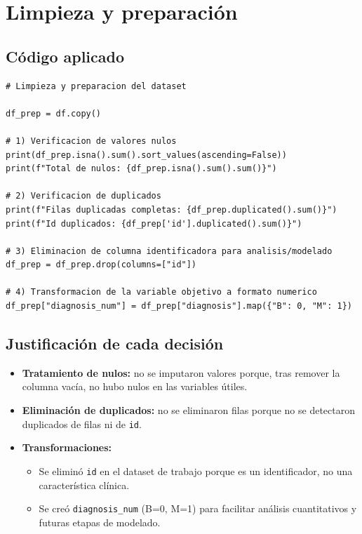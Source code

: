 \section{Limpieza y preparación}

\subsection{Código aplicado}
\begin{lstlisting}
# Limpieza y preparacion del dataset

df_prep = df.copy()

# 1) Verificacion de valores nulos
print(df_prep.isna().sum().sort_values(ascending=False))
print(f"Total de nulos: {df_prep.isna().sum().sum()}")

# 2) Verificacion de duplicados
print(f"Filas duplicadas completas: {df_prep.duplicated().sum()}")
print(f"Id duplicados: {df_prep['id'].duplicated().sum()}")

# 3) Eliminacion de columna identificadora para analisis/modelado
df_prep = df_prep.drop(columns=["id"])

# 4) Transformacion de la variable objetivo a formato numerico
df_prep["diagnosis_num"] = df_prep["diagnosis"].map({"B": 0, "M": 1})
\end{lstlisting}

\subsection{Justificación de cada decisión}
\begin{itemize}
    \item \textbf{Tratamiento de nulos:} no se imputaron valores porque, tras remover la columna vacía, no hubo nulos en las variables útiles.
    \item \textbf{Eliminación de duplicados:} no se eliminaron filas porque no se detectaron duplicados de filas ni de \texttt{id}.
    \item \textbf{Transformaciones:}
    \begin{itemize}
        \item Se eliminó \texttt{id} en el dataset de trabajo porque es un identificador, no una característica clínica.
        \item Se creó \texttt{diagnosis\_num} (B=0, M=1) para facilitar análisis cuantitativos y futuras etapas de modelado.
    \end{itemize}
\end{itemize}

